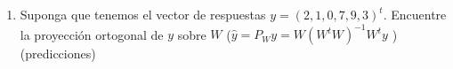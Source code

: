\documentclass[12pt,a4paper]{report}
\begin{document}
\begin{enumerate}
\begin{enumerate}
\begin{eqnarray*}
\begin{bmatrix}
0 & 1 & 0 \\
0 & 1 & 0 \\
0 & 0 & 1
\end{bmatrix}
\left(\begin{matrix}
\frac{1}{3} & 0 & 0 \\
0 & \frac{1}{2} & 0 \\
0 & 0 & 1
\end{matrix}\right)
\begin{bmatrix}
1 & 1 & 1 & 0 & 0 & 0 \\
0 & 0 & 0 & 1 & 1 & 0 \\
0 & 0 & 0 & 0 & 0 & 1
\end{bmatrix}\\
&=&
\begin{bmatrix}
\frac{1}{3} & 0 & 0 \\
\frac{1}{3} & 0 & 0 \\
\frac{1}{3} & 0 & 0 \\
0 & \frac{1}{2} & 0 \\
0 & \frac{1}{2} & 0 \\
0 & 0 & 1
\end{bmatrix}
\begin{bmatrix}
1 & 1 & 1 & 0 & 0 & 0 \\
0 & 0 & 0 & 1 & 1 & 0 \\
0 & 0 & 0 & 0 & 0 & 1
\end{bmatrix} =
\begin{bmatrix}
\frac{1}{3} & \frac{1}{3} & \frac{1}{3} & 0 & 0 & 0 \\
\frac{1}{3} & \frac{1}{3} & \frac{1}{3} & 0 & 0 & 0 \\
\frac{1}{3} & \frac{1}{3} & \frac{1}{3} & 0 & 0 & 0 \\
0 & 0 & 0 & \frac{1}{2} & \frac{1}{2} & 0 \\
0 & 0 & 0 & \frac{1}{2} & \frac{1}{2} & 0 \\
0 & 0 & 0 & 0 & 0 & 1
\end{bmatrix}
\end{eqnarray*}


\item[3.] Suponga que tenemos el vector de respuestas $y = (2, 1, 0, 7, 9, 3)^t$. Encuentre la proyección ortogonal de $y$ sobre $W$ ($\widehat{y} = P_W y = W(W^tW)^{-1}W^t y$ ) (predicciones)


\end{enumerate}
\end{enumerate}
\end{document}
